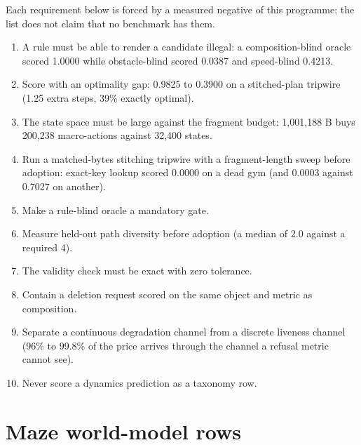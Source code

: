 \documentclass{article} %
\begin{document}
Each requirement below is forced by a measured negative of this programme; the list does not
claim that no benchmark has them. %
\begin{enumerate}[leftmargin=*,itemsep=1pt]
\item A rule must be able to render a candidate illegal: a composition-blind oracle scored 1.0000
  while obstacle-blind scored 0.0387 and speed-blind 0.4213. %
\item Score with an optimality gap: 0.9825 to 0.3900 on a stitched-plan tripwire (1.25 extra steps,
  39\% exactly optimal). %
\item The state space must be large against the fragment budget: 1,001,188 B buys 200,238
  macro-actions against 32,400 states. %
\item Run a matched-bytes stitching tripwire with a fragment-length sweep before adoption: exact-key
  lookup scored 0.0000 on a dead gym (and 0.0003 against 0.7027 on another).
\item Make a rule-blind oracle a mandatory gate.
\item Measure held-out path diversity before adoption (a median of 2.0 against a required 4).
\item The validity check must be exact with zero tolerance.
\item Contain a deletion request scored on the same object and metric as composition.
\item Separate a continuous degradation channel from a discrete liveness channel (96\% to 99.8\% of
  the price arrives through the channel a refusal metric cannot see). %
\item Never score a dynamics prediction as a taxonomy row.
\end{enumerate}

\section{Maze world-model rows}
\label{app:mazewm}
\end{document}
